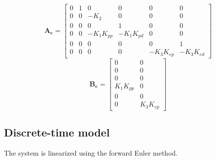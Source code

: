 \documentclass[11pt,a4paper,USenglish]{article} %
\begin{document}
\begin{equation}
    \mathbf{A_c} = \begin{bmatrix} 0 & 1 & 0 & 0 & 0 & 0 \\ 0 & 0 & -K_2 & 0 & 0 & 0  \\ 0 & 0 & 0 & 1 & 0 & 0 \\ 0 & 0 & -K_1K_{pp} & -K_1K_{pd} & 0 & 0 \\ 0 & 0 & 0 & 0 & 0 & 1 \\ 0 & 0 & 0 & 0 & -K_{3}K_{ep} & -K_{3}K_{ed}
\end{bmatrix}
\end{equation}
\begin{equation}
    \mathbf{B_c} = \begin{bmatrix}0 & 0 \\ 0 & 0 \\ 0 & 0 \\ K_1K_{pp} & 0 \\ 0 & 0 \\ 0 &  K_{3}K_{ep} \end{bmatrix}
    \label{eq:sselev}
\end{equation}

\subsection{Discrete-time model}
The system is linearized using the forward Euler method. 
\end{document}
